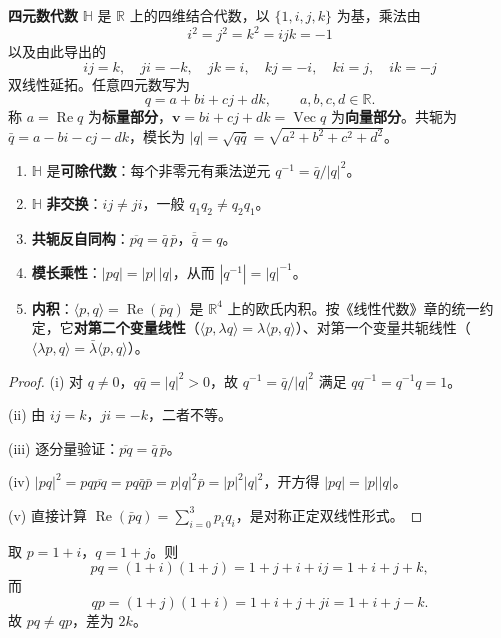 \begin{definition}[四元数代数]\label{def:q_quaternion}
\textbf{四元数代数} $\mathbb{H}$ 是 $\mathbb{R}$ 上的四维结合代数，以 $\{1,i,j,k\}$ 为基，乘法由
\[
i^2=j^2=k^2=ijk=-1
\]
以及由此导出的
\[
ij=k,\quad ji=-k,\quad jk=i,\quad kj=-i,\quad ki=j,\quad ik=-j
\]
双线性延拓。任意四元数写为
\[
q=a+bi+cj+dk,\qquad a,b,c,d\in\mathbb{R}.
\]
称 $a=\operatorname{Re}q$ 为\textbf{标量部分}，$\mathbf{v}=bi+cj+dk=\operatorname{Vec}q$ 为\textbf{向量部分}。共轭为 $\bar q=a-bi-cj-dk$，模长为 $|q|=\sqrt{q\bar q}=\sqrt{a^2+b^2+c^2+d^2}$。
\end{definition}

\begin{property}[四元数的基本代数性质]\label{prop:q_basic_props}
\begin{enumerate}[label=(\roman*)]
    \item $\mathbb{H}$ 是\textbf{可除代数}：每个非零元有乘法逆元 $q^{-1}=\bar q/|q|^2$。
    \item $\mathbb{H}$ \textbf{非交换}：$ij\neq ji$，一般 $q_1q_2\neq q_2q_1$。
    \item \textbf{共轭反自同构}：$\overline{pq}=\bar q\,\bar p$，$\overline{\bar q}=q$。
    \item \textbf{模长乘性}：$|pq|=|p|\,|q|$，从而 $|q^{-1}|=|q|^{-1}$。
    \item \textbf{内积}：$\langle p,q\rangle=\operatorname{Re}(\bar p q)$ 是 $\mathbb{R}^4$ 上的欧氏内积。按《线性代数》章的统一约定，它\textbf{对第二个变量线性}（$\langle p,\lambda q\rangle=\lambda\langle p,q\rangle$）、对第一个变量共轭线性（$\langle \lambda p,q\rangle=\bar\lambda\langle p,q\rangle$）。
\end{enumerate}
\end{property}

\begin{proof}
(i) 对 $q\neq 0$，$q\bar q=|q|^2>0$，故 $q^{-1}=\bar q/|q|^2$ 满足 $qq^{-1}=q^{-1}q=1$。

(ii) 由 $ij=k$，$ji=-k$，二者不等。

(iii) 逐分量验证：$\overline{pq}=\bar q\,\bar p$。

(iv) $|pq|^2=pq\overline{pq}=pq\bar q\bar p=p|q|^2\bar p=|p|^2|q|^2$，开方得 $|pq|=|p||q|$。

(v) 直接计算 $\operatorname{Re}(\bar p q)=\sum_{i=0}^3 p_iq_i$，是对称正定双线性形式。
\end{proof}

\begin{example}[四元数乘法实例]\label{ex:q_multiplication}
取 $p=1+i$，$q=1+j$。则
\[
pq=(1+i)(1+j)=1+j+i+ij=1+i+j+k,
\]
而
\[
qp=(1+j)(1+i)=1+i+j+ji=1+i+j-k.
\]
故 $pq\neq qp$，差为 $2k$。
\end{example}

